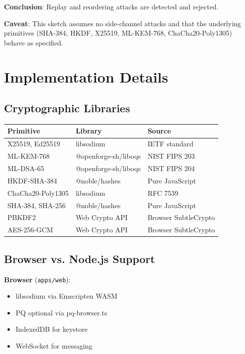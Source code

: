 \documentclass[11pt,a4paper,oneside]{article}
\begin{document}
\textbf{Conclusion}: Replay and reordering attacks are detected and rejected.

\textbf{Caveat}: This sketch assumes no side-channel attacks and that the underlying primitives (SHA-384, HKDF, X25519, ML-KEM-768, ChaCha20-Poly1305) behave as specified.

\section{Implementation Details}

\subsection{Cryptographic Libraries}

\begin{table}[h]
\centering
\begin{tabular}{lll}
\toprule
Primitive & Library & Source \\
\midrule
X25519, Ed25519 & libsodium & IETF standard \\
ML-KEM-768 & @openforge-sh/liboqs & NIST FIPS 203 \\
ML-DSA-65 & @openforge-sh/liboqs & NIST FIPS 204 \\
HKDF-SHA-384 & @noble/hashes & Pure JavaScript \\
ChaCha20-Poly1305 & libsodium & RFC 7539 \\
SHA-384, SHA-256 & @noble/hashes & Pure JavaScript \\
PBKDF2 & Web Crypto API & Browser SubtleCrypto \\
AES-256-GCM & Web Crypto API & Browser SubtleCrypto \\
\bottomrule
\end{tabular}
\end{table}

\subsection{Browser vs. Node.js Support}

\textbf{Browser} (\texttt{apps/web}):
\begin{itemize}
\item libsodium via Emscripten WASM
\item PQ optional via pq-browser.ts
\item IndexedDB for keystore
\item WebSocket for messaging
\end{itemize}
\end{document}
